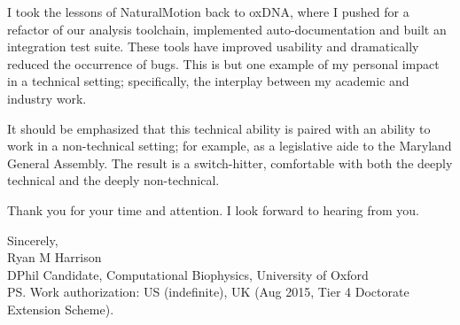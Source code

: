\documentclass{../res}
\begin{document}
\begin{sloppypar}
\begin{resume}
I took the lessons of NaturalMotion back to oxDNA, where I pushed for a refactor of our analysis toolchain, implemented auto-documentation and built an integration test suite. These tools have improved usability and dramatically reduced the occurrence of bugs. This is but one example of my personal impact in a technical setting; specifically, the interplay between my academic and industry work.

It should be emphasized that this technical ability is paired with an ability to work in a non-technical setting; for example, as a legislative aide to the Maryland General Assembly. The result is a switch-hitter, comfortable with both the deeply technical and the deeply non-technical.

Thank you for your time and attention. I look forward to hearing from you.

Sincerely, \\
Ryan M Harrison \\ 
DPhil Candidate, Computational Biophysics, University of Oxford  \\
PS. Work authorization: US (indefinite), UK (Aug 2015, Tier 4 Doctorate Extension Scheme).
\end{resume} 
\end{sloppypar}
\end{document}
